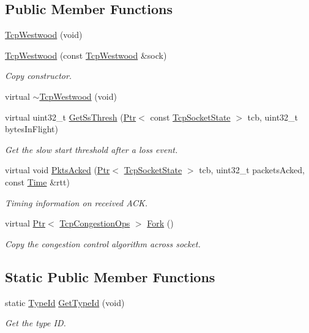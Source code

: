 \subsection*{Public Member Functions}
\begin{DoxyCompactItemize}
\item 
\hyperlink{classns3_1_1TcpWestwood_aecff9eac8b8f66830d2e542ad9ccd69c}{Tcp\+Westwood} (void)
\item 
\hyperlink{classns3_1_1TcpWestwood_a501042cdf79495587be437822f0eac31}{Tcp\+Westwood} (const \hyperlink{classns3_1_1TcpWestwood}{Tcp\+Westwood} \&sock)
\begin{DoxyCompactList}\small\item\em Copy constructor. \end{DoxyCompactList}\item 
virtual \hyperlink{classns3_1_1TcpWestwood_a7c9cddd1b80f245a4d48ba49b6970b71}{$\sim$\+Tcp\+Westwood} (void)
\item 
virtual uint32\+\_\+t \hyperlink{classns3_1_1TcpWestwood_a9e3849fbc8244c5748e49ab2e8b149c4}{Get\+Ss\+Thresh} (\hyperlink{classns3_1_1Ptr}{Ptr}$<$ const \hyperlink{classns3_1_1TcpSocketState}{Tcp\+Socket\+State} $>$ tcb, uint32\+\_\+t bytes\+In\+Flight)
\begin{DoxyCompactList}\small\item\em Get the slow start threshold after a loss event. \end{DoxyCompactList}\item 
virtual void \hyperlink{classns3_1_1TcpWestwood_a5e7c9809e45567a0492a685db4b59251}{Pkts\+Acked} (\hyperlink{classns3_1_1Ptr}{Ptr}$<$ \hyperlink{classns3_1_1TcpSocketState}{Tcp\+Socket\+State} $>$ tcb, uint32\+\_\+t packets\+Acked, const \hyperlink{classns3_1_1Time}{Time} \&rtt)
\begin{DoxyCompactList}\small\item\em Timing information on received A\+CK. \end{DoxyCompactList}\item 
virtual \hyperlink{classns3_1_1Ptr}{Ptr}$<$ \hyperlink{classns3_1_1TcpCongestionOps}{Tcp\+Congestion\+Ops} $>$ \hyperlink{classns3_1_1TcpWestwood_ab601df846ac101da7fdd0e76ca8cffa0}{Fork} ()
\begin{DoxyCompactList}\small\item\em Copy the congestion control algorithm across socket. \end{DoxyCompactList}\end{DoxyCompactItemize}
\subsection*{Static Public Member Functions}
\begin{DoxyCompactItemize}
\item 
static \hyperlink{classns3_1_1TypeId}{Type\+Id} \hyperlink{classns3_1_1TcpWestwood_af992db5914335d1c8e5cac8fe5155e2c}{Get\+Type\+Id} (void)
\begin{DoxyCompactList}\small\item\em Get the type ID. \end{DoxyCompactList}\end{DoxyCompactItemize}
